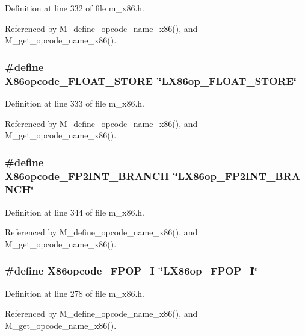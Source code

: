Definition at line 332 of file m\_\-x86.h.

Referenced by M\_\-define\_\-opcode\_\-name\_\-x86(), and M\_\-get\_\-opcode\_\-name\_\-x86().
\subsubsection{\setlength{\rightskip}{0pt plus 5cm}\#define X86opcode\_\-FLOAT\_\-STORE~\char`\"{}LX86op\_\-FLOAT\_\-STORE\char`\"{}}\label{m__x86_8h_baa4aeeb9b18f991c7e5da7118e95478}




Definition at line 333 of file m\_\-x86.h.

Referenced by M\_\-define\_\-opcode\_\-name\_\-x86(), and M\_\-get\_\-opcode\_\-name\_\-x86().
\subsubsection{\setlength{\rightskip}{0pt plus 5cm}\#define X86opcode\_\-FP2INT\_\-BRANCH~\char`\"{}LX86op\_\-FP2INT\_\-BRANCH\char`\"{}}\label{m__x86_8h_4bd46ab28d4480d38dd58d037111b620}




Definition at line 344 of file m\_\-x86.h.

Referenced by M\_\-define\_\-opcode\_\-name\_\-x86(), and M\_\-get\_\-opcode\_\-name\_\-x86().
\subsubsection{\setlength{\rightskip}{0pt plus 5cm}\#define X86opcode\_\-FPOP\_\-I~\char`\"{}LX86op\_\-FPOP\_\-I\char`\"{}}\label{m__x86_8h_6a6a10d6e29c06f04b3e7329e16bad29}




Definition at line 278 of file m\_\-x86.h.

Referenced by M\_\-define\_\-opcode\_\-name\_\-x86(), and M\_\-get\_\-opcode\_\-name\_\-x86().
